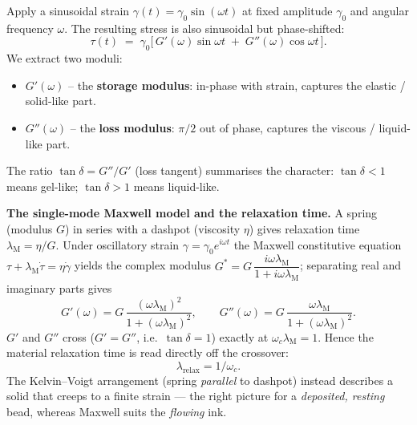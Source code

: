 \documentclass[11pt,a4paper]{article}
\begin{document}
Apply a sinusoidal strain $\gamma(t)=\gamma_0\sin(\omega t)$ at fixed
amplitude $\gamma_0$ and angular frequency $\omega$. The resulting stress
is also sinusoidal but phase-shifted:
\begin{equation}
\tau(t) \;=\; \gamma_0\bigl[\,G'(\omega)\sin\omega t
\;+\; G''(\omega)\cos\omega t\,\bigr].
\label{eq:saos}
\end{equation}
We extract two moduli:
\begin{itemize}[leftmargin=1.6em,itemsep=2pt]
\item $G'(\omega)$ -- the \textbf{storage modulus}: in-phase with strain,
captures the elastic / solid-like part.
\item $G''(\omega)$ -- the \textbf{loss modulus}: $\pi/2$ out of phase,
captures the viscous / liquid-like part.
\end{itemize}

The ratio $\tan\delta = G''/G'$ (loss tangent) summarises the character:
$\tan\delta < 1$ means gel-like; $\tan\delta > 1$ means liquid-like.

\begin{derivationbox}
\textbf{The single-mode Maxwell model and the relaxation time.}
A spring (modulus $G$) in series with a dashpot (viscosity $\eta$) gives
relaxation time $\lambda_\mathrm{M}=\eta/G$.
Under oscillatory strain $\gamma=\gamma_0 e^{i\omega t}$ the Maxwell
constitutive equation $\tau+\lambda_\mathrm{M}\dot\tau=\eta\dot\gamma$ yields
the complex modulus
$G^*=G\,\dfrac{i\omega\lambda_\mathrm{M}}{1+i\omega\lambda_\mathrm{M}}$;
separating real and imaginary parts gives
\begin{equation}
G'(\omega)=G\,\frac{(\omega\lambda_\mathrm{M})^2}{1+(\omega\lambda_\mathrm{M})^2},
\qquad
G''(\omega)=G\,\frac{\omega\lambda_\mathrm{M}}{1+(\omega\lambda_\mathrm{M})^2}.
\label{eq:maxwell}
\end{equation}
$G'$ and $G''$ cross ($G'=G''$, i.e.\ $\tan\delta=1$) exactly at
$\omega_c\lambda_\mathrm{M}=1$. Hence the material relaxation time is read
directly off the crossover:
\begin{equation}
\lambda_\mathrm{relax}=1/\omega_c.
\label{eq:lambda_cross}
\end{equation}
The Kelvin--Voigt arrangement (spring \emph{parallel} to dashpot) instead
describes a solid that creeps to a finite strain --- the right picture for
a \emph{deposited, resting} bead, whereas Maxwell suits the \emph{flowing}
ink.
\end{derivationbox}
\end{document}

